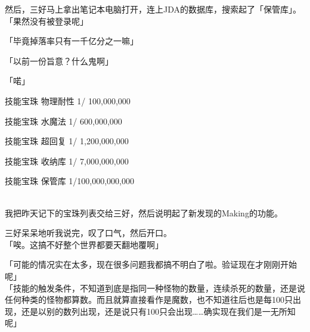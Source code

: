 然后，三好马上拿出笔记本电脑打开，连上JDA的数据库，搜索起了「保管库」。\\

「果然没有被登录呢」

「毕竟掉落率只有一千亿分之一嘛」

「以前一份旨意？什么鬼啊」

「喏」\\

\cardline

  技能宝珠  物理耐性 1/    100,000,000

  技能宝珠    水魔法 1/    600,000,000

  技能宝珠    超回复 1/  1,200,000,000

  技能宝珠    收纳库 1/  7,000,000,000

  技能宝珠    保管库 1/100,000,000,000

\cardline\\


我把昨天记下的宝珠列表交给三好，然后说明起了新发现的Making的功能。

三好呆呆地听我说完，叹了口气，然后开口。\\

「唉。这搞不好整个世界都要天翻地覆啊」

「可能的情况实在太多，现在很多问题我都搞不明白了啦。验证现在才刚刚开始呢」\\

「技能的触发条件，不知道到底是指同一种怪物的数量，连续杀死的数量，还是说任何种类的怪物都算数。而且就算直接看作是魔数，也不知道往后也是每100只出现，还是以别的数列出现，还是说只有100只会出现……确实现在我们是一无所知呢」

